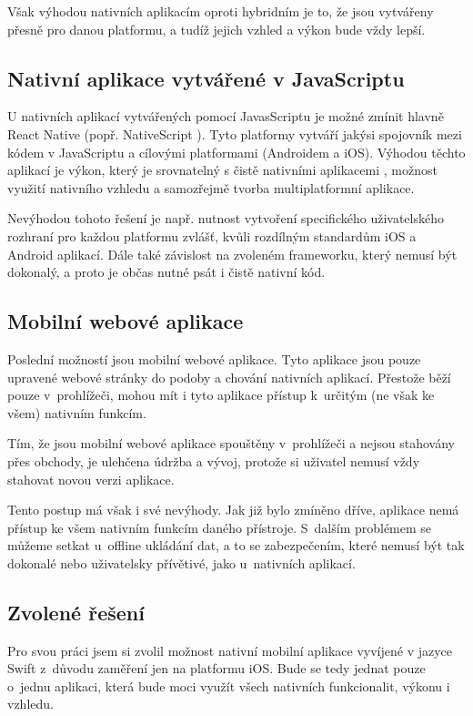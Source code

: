 \documentclass[thesis=M,czech]{FITthesis}[2012/06/26]
\begin{document}
Však výhodou nativních aplikacím oproti hybridním je to, že jsou vytvářeny přesně pro danou platformu, a tudíž jejich vzhled a výkon bude vždy lepší. \cite{upwork}

\subsection{Nativní aplikace vytvářené v JavaScriptu}
U nativních aplikací vytvářených pomocí JavasScriptu je možné zmínit hlavně React Native \cite{reactNative} (popř. NativeScript \cite{nativeScript}). Tyto platformy vytváří jakýsi spojovník mezi kódem v JavaScriptu a cílovými platformami (Androidem a iOS). \cite{reactNative} Výhodou těchto aplikací je výkon, který je srovnatelný s čistě nativními aplikacemi \cite{calderaio}, možnost využití nativního vzhledu a samozřejmě tvorba multiplatformní aplikace. \cite{reactNative}

Nevýhodou tohoto řešení je např. nutnost vytvoření specifického uživatelského rozhraní pro každou platformu zvlášť, kvůli rozdílným standardům iOS a Android aplikací. Dále také závislost na zvoleném frameworku, který nemusí být dokonalý, a proto je občas nutné psát i čistě nativní kód. \cite{girish}

\subsection{Mobilní webové aplikace}
Poslední možností jsou mobilní webové aplikace. Tyto aplikace jsou pouze upravené webové stránky do podoby a chování nativních aplikací. Přestože běží pouze v~prohlížeči, mohou mít i tyto aplikace přístup k~určitým (ne však ke všem) nativním funkcím. \cite{Nielsen}

Tím, že jsou mobilní webové aplikace spouštěny v~prohlížeči a nejsou stahovány přes obchody, je ulehčena údržba a vývoj, protože si uživatel nemusí vždy stahovat novou verzi aplikace.

Tento postup má však i své nevýhody. Jak již bylo zmíněno dříve, aplikace nemá přístup ke všem nativním funkcím daného přístroje. S~dalším problémem se můžeme setkat u~offline ukládání dat, a to se zabezpečením, které nemusí být tak dokonalé nebo uživatelsky přívětivé, jako u~nativních aplikací.  \cite{saleforce}

\subsection{Zvolené řešení}
Pro svou práci jsem si zvolil možnost nativní mobilní aplikace vyvíjené v jazyce Swift z~důvodu zaměření jen na platformu iOS. Bude se tedy jednat pouze o~jednu aplikaci, která bude moci využít všech nativních funkcionalit, výkonu i vzhledu.
\end{document}
